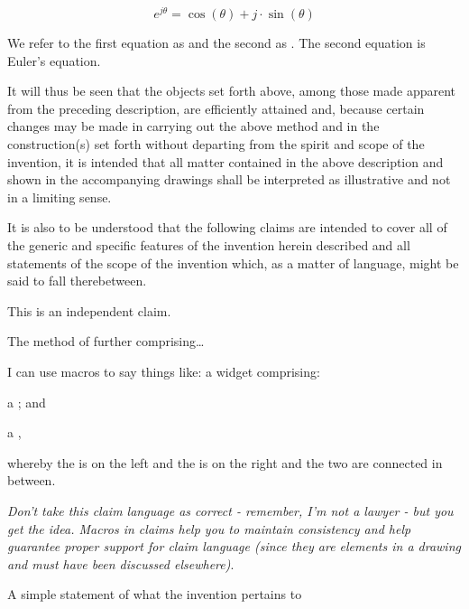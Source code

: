 \documentclass[english]{uspatent}
\begin{document}
\begin{equation}
e^{j\theta}=\cos\left(\theta\right)+j\cdot\sin\left(\theta\right)\label{eq:euler}
\end{equation}

\patentParagraph We refer to the first equation as  and the second as . The second equation  is Euler's equation.

\patentParagraph It will thus be seen that the objects set forth above, among those made apparent from the preceding description, are efficiently attained and, because certain changes may be made in carrying out the above method and in the construction(s) set forth without departing from the spirit and scope of the invention, it is intended that all matter contained in the above description and shown in the accompanying drawings shall be interpreted as illustrative and not in a limiting sense.

\patentParagraph It is also to be understood that the following claims are intended to cover all of the generic and specific features of the invention herein described and all statements of the scope of the invention which, as a matter of language, might be said to fall therebetween.

\patentClaimsStart


This is an independent claim.


The method of  further comprising\ldots{}


I can use macros to say things like: a widget comprising:

a ; and

a ,

whereby the  is on the left and the  is on the right and the two are connected in between.

\emph{Don't take this claim language as correct - remember, I'm not a lawyer - but you get the idea. Macros in claims help you to maintain consistency and help guarantee proper support for claim language (since they are elements in a drawing and must have been discussed elsewhere)}.

\patentClaimsEnd


A simple statement of what the invention pertains to

\patentDrawings
\end{document}
